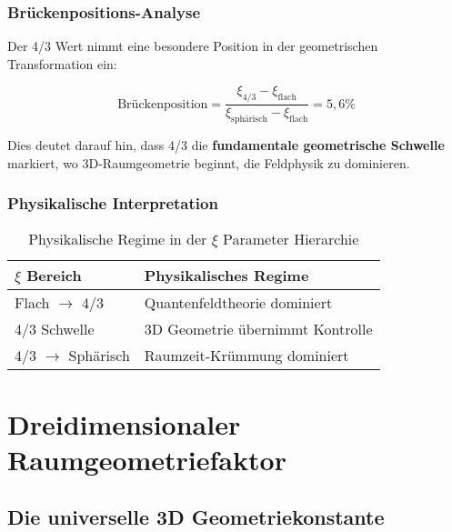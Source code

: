 \documentclass[12pt,a4paper]{article}
\newcommand{\xipar}{\ensuremath{\xi}}
\newcommand{\myrightarrow}{\ensuremath{\rightarrow}}
\begin{document}
	\subsubsection{Brückenpositions-Analyse}
	\label{subsubsec:brueckenposition}
	
	Der 4/3 Wert nimmt eine besondere Position in der geometrischen Transformation ein:
	
	\begin{equation}
		\text{Brückenposition} = \frac{\xipar_{4/3} - \xipar_{\text{flach}}}{\xipar_{\text{sphärisch}} - \xipar_{\text{flach}}} = 5,6\%
		\label{eq:brueckenposition}
	\end{equation}
	
	Dies deutet darauf hin, dass 4/3 die \textbf{fundamentale geometrische Schwelle} markiert, wo 3D-Raumgeometrie beginnt, die Feldphysik zu dominieren.
	
	\subsubsection{Physikalische Interpretation}
	\label{subsubsec:physikalische_interpretation}
	
	\begin{table}[htbp]
		\centering
		\begin{tabular}{ll}
			\toprule
			\textbf{$\xi$ Bereich} & \textbf{Physikalisches Regime} \\
			\midrule
			Flach $\myrightarrow$ 4/3 & Quantenfeldtheorie dominiert \\
			4/3 Schwelle & 3D Geometrie übernimmt Kontrolle \\
			4/3 $\myrightarrow$ Sphärisch & Raumzeit-Krümmung dominiert \\
			\bottomrule
		\end{tabular}
		\caption{Physikalische Regime in der $\xi$ Parameter Hierarchie}
		\label{tab:physikalische_regime}
	\end{table}
	
	\section{Dreidimensionaler Raumgeometriefaktor}
	\label{sec:3d_geometriefaktor}
	
	\subsection{Die universelle 3D Geometriekonstante}
	\label{subsec:universelle_3d_konstante}
	
\end{document}
